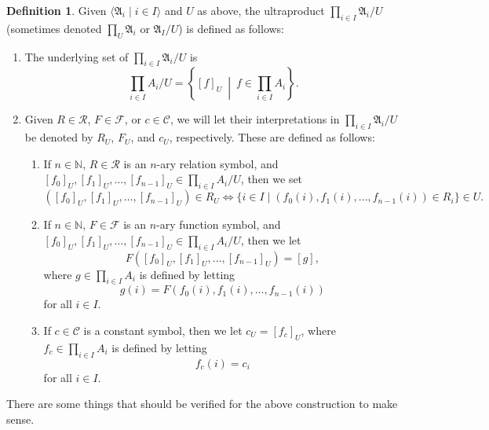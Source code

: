 \documentclass[a4paper]{memoir}
\theoremstyle{definition}
\newtheorem{definition}[theorem]{Definition}
\newcommand{\bb}{\mathbb}
\newcommand{\mc}{\mathcal}
\begin{document}
\begin{definition} \label{def: ultraproduct}
  Given $\langle \mathfrak{A}_i \mid i \in I \rangle$ and $U$ as above, the ultraproduct 
  $\prod_{i \in I} \mathfrak{A}_i / U$ (sometimes denoted $\prod_U \mathfrak{A}_i$ 
  or $\mathfrak{A}_I/U$) is 
  defined as follows:
  \begin{enumerate}
    \item The underlying set of $\prod_{i \in I} \mathfrak{A}_i /U$ is
    \[
      \prod_{i \in I} A_i /U = \left\{ [f]_U \ \middle| \ f \in \prod_{i \in I} A_i \right\}.
    \]
    \item Given $R \in \mc{R}$, $F \in \mc{F}$, or $c \in \mc{C}$, we will let their interpretations 
    in $\prod_{i \in I} \mathfrak{A}_i / U$ be denoted by 
    $R_U$, $F_U$, and $c_U$, 
    respectively. These are defined as follows:
    \begin{enumerate}
      \item If $n \in \bb{N}$, $R \in \mc{R}$ is an $n$-ary relation symbol, and 
      $[f_0]_U, [f_1]_U, \ldots, [f_{n-1}]_U \in \prod_{i \in I} A_i /U$, then we set
      \[
        ([f_0]_U, [f_1]_U, \ldots, [f_{n-1}]_U) \in R_U \Longleftrightarrow 
        \{i \in I \mid (f_0(i), f_1(i), \ldots, f_{n-1}(i)) \in R_i \} \in U.
      \]
      \item If $n \in \bb{N}$, $F \in \mc{F}$ is an $n$-ary function symbol, and 
      $[f_0]_U, [f_1]_U, \ldots, [f_{n-1}]_U \in \prod_{i \in I} A_i /U$, then we let 
      \[
        F([f_0]_U, [f_1]_U, \ldots, [f_{n-1}]_U) = [g],
      \]
      where $g \in \prod_{i \in I} A_i$ is defined by letting 
      \[
        g(i) = F(f_0(i), f_1(i), \ldots, f_{n-1}(i))
      \]
      for all $i \in I$.
      \item If $c \in \mc{C}$ is a constant symbol, then we let $c_U = [f_c]_U$, 
      where $f_c \in \prod_{i \in I} A_i$ is defined by letting 
      \[
        f_c(i) = c_i
      \]
      for all $i \in I$.
    \end{enumerate}
  \end{enumerate}
\end{definition}

There are some things that should be verified for the above construction to make sense.
\end{document}
